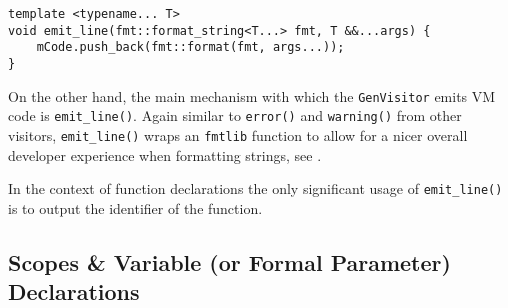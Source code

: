\begin{lstlisting}[caption={The \texttt{emit\_line()} method in
the \texttt{GenVisitor} class (ir\_gen/GenVisitor.cpp)},
label=lst:emitline]
template <typename... T>
void emit_line(fmt::format_string<T...> fmt, T &&...args) {
    mCode.push_back(fmt::format(fmt, args...));
}
\end{lstlisting}

On the other hand, the main mechanism with which the
\texttt{GenVisitor} emits VM code is \texttt{emit\_line()}.
Again similar to \texttt{error()} and \texttt{warning()} from
other visitors, \texttt{emit\_line()} wraps an \texttt{fmtlib}
function to allow for a nicer overall developer experience when
formatting strings, see .

In the context of function declarations the only significant
usage of \texttt{emit\_line()} is to output the identifier of
the function.

\subsection{Scopes \& Variable (or Formal Parameter)
Declarations}

